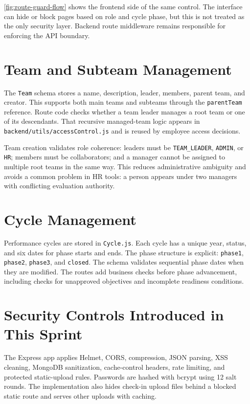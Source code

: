 


\cref{fig:route-guard-flow} shows the frontend side of the same control. The interface can hide or block pages based on role and cycle phase, but this is not treated as the only security layer. Backend route middleware remains responsible for enforcing the API boundary.

\section{Team and Subteam Management}
The \texttt{Team} schema stores a name, description, leader, members, parent team, and creator. This supports both main teams and subteams through the \texttt{parentTeam} reference. Route code checks whether a team leader manages a root team or one of its descendants. That recursive managed-team logic appears in \texttt{backend/utils/accessControl.js} and is reused by employee access decisions.

Team creation validates role coherence: leaders must be \texttt{TEAM\_LEADER}, \texttt{ADMIN}, or \texttt{HR}; members must be collaborators; and a manager cannot be assigned to multiple root teams in the same way. This reduces administrative ambiguity and avoids a common problem in HR tools: a person appears under two managers with conflicting evaluation authority.

\section{Cycle Management}
Performance cycles are stored in \texttt{Cycle.js}. Each cycle has a unique year, status, and six dates for phase starts and ends. The phase structure is explicit: \texttt{phase1}, \texttt{phase2}, \texttt{phase3}, and \texttt{closed}. The schema validates sequential phase dates when they are modified. The routes add business checks before phase advancement, including checks for unapproved objectives and incomplete readiness conditions.



\section{Security Controls Introduced in This Sprint}
The Express app applies Helmet, CORS, compression, JSON parsing, XSS cleaning, MongoDB sanitization, cache-control headers, rate limiting, and protected static-upload rules. Passwords are hashed with bcrypt using 12 salt rounds. The implementation also hides check-in upload files behind a blocked static route and serves other uploads with caching.

